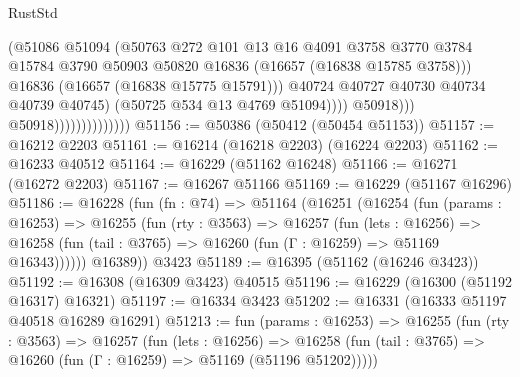 \begin{lexlean}{RustStd}
\begin{coremodule}
                                              (@51086
                                                @51094
                                                (@50763
                                                  @272
                                                  @101
                                                  @13
                                                  @16
                                                  @4091
                                                  @3758
                                                  @3770
                                                  @3784
                                                  @15784
                                                  @3790
                                                  @50903
                                                  @50820
                                                  @16836
                                                  (@16657 (@16838 @15785 @3758)))
                                                @16836
                                                (@16657 (@16838 @15775 @15791)))
                                              @40724
                                              @40727
                                              @40730
                                              @40734
                                              @40739
                                              @40745)
                                            (@50725 @534 @13 @4769 @51094))))
                                      @50918)))
                                @50918))))))))))))))
@51156 := @50386 (@50412 (@50454 @51153))
@51157 := @16212 @2203
@51161 := @16214 (@16218 @2203) (@16224 @2203)
@51162 := @16233 @40512
@51164 := @16229 (@51162 @16248)
@51166 := @16271 (@16272 @2203)
@51167 := @16267 @51166
@51169 := @16229 (@51167 @16296)
@51186 := @16228
    (fun (fn : @74) =>
    @51164
      (@16251
        (@16254
          (fun (params : @16253) =>
          @16255
            (fun (rty : @3563) =>
            @16257
              (fun (lets : @16256) =>
              @16258 (fun (tail : @3765) => @16260 (fun (Γ : @16259) => @51169 @16343))))))
        @16389))
    @3423
@51189 := @16395 (@51162 (@16246 @3423))
@51192 := @16308 (@16309 @3423) @40515
@51196 := @16229 (@16300 (@51192 @16317) @16321)
@51197 := @16334 @3423
@51202 := @16331 (@16333 @51197 @40518 @16289 @16291)
@51213 := fun (params : @16253) =>
  @16255
    (fun (rty : @3563) =>
    @16257
      (fun (lets : @16256) =>
      @16258 (fun (tail : @3765) => @16260 (fun (Γ : @16259) => @51169 (@51196 @51202)))))

\end{coremodule}
\end{lexlean}
